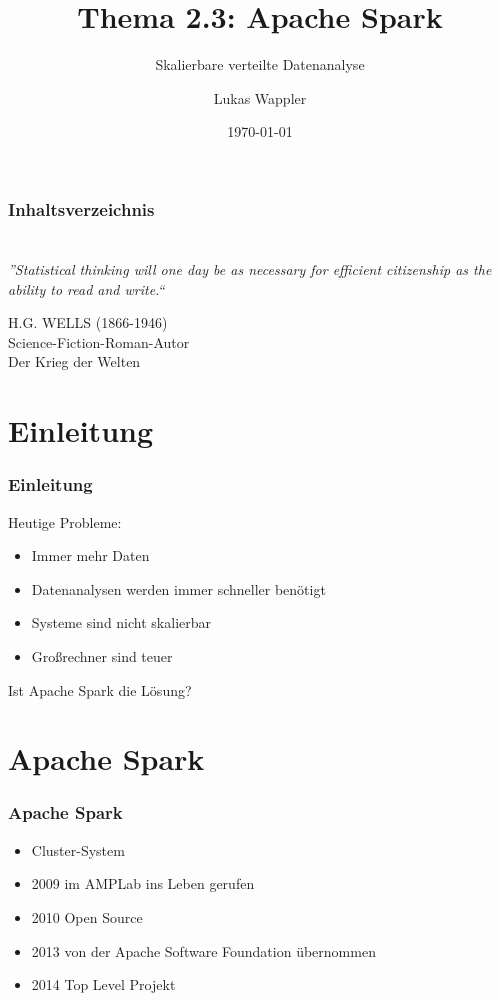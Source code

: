 \documentclass[hyperref={pdfpagelabels=false}]{beamer}
\title{Thema 2.3: Apache Spark}
\subtitle{Skalierbare verteilte Datenanalyse}
\author{Lukas Wappler}
\date{\today}
\begin{document}
\begin{frame}
\titlepage
\end{frame} 


\begin{frame}
\frametitle{Inhaltsverzeichnis}
\setcounter{tocdepth}{1}
\tableofcontents
\end{frame} 





\section{} 
\begin{frame}
\frametitle{} 
\begin{center}
\textit{\LARGE{”Statistical thinking will one day be as necessary for efficient citizenship as the ability to read and write.“}}
\end{center}
\vspace{0.5cm} 
\begin{flushright}
\footnotesize{H.G. WELLS (1866-1946)\\ Science-Fiction-Roman-Autor\\ Der Krieg der Welten}
\end{flushright}

\end{frame}


\section*{Einleitung} 
\begin{frame}[t]
\frametitle{Einleitung} 

Heutige Probleme:
\begin{itemize}
\item  Immer mehr Daten 
\item  Datenanalysen werden immer schneller benötigt
\item  Systeme sind nicht skalierbar
\item  Großrechner sind teuer
\end{itemize}  


 { \huge{Ist Apache Spark die Lösung?}  }

\end{frame}

\section{Apache Spark} 
\begin{frame} [t]
\frametitle{Apache Spark} 


\begin{itemize}
	\item Cluster-System
	\item 2009 im AMPLab ins Leben gerufen
	\item 2010 Open Source	
	\item 2013 von der Apache Software Foundation übernommen
	\item 2014 Top Level Projekt		
\end{itemize}

\end{frame}
\end{document}
